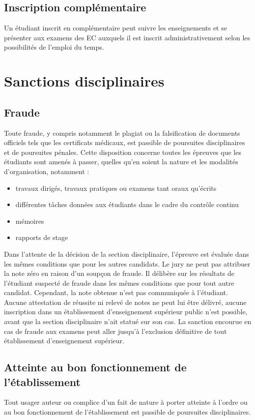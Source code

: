 \documentclass[a4paper,11pt]{article}
\begin{document}
\subsection{Inscription complémentaire}
Un étudiant inscrit en complémentaire peut suivre les enseignements et se présenter aux examens des EC auxquels il est inscrit administrativement selon les possibilités de l'emploi du temps.


\section{Sanctions disciplinaires}

\subsection{Fraude}
Toute fraude, y compris notamment le plagiat ou la falsification de documents officiels tels que les certificats médicaux, est passible de poursuites disciplinaires et de poursuites pénales. Cette disposition concerne toutes les épreuves que les étudiants sont amenés à passer, quelles qu'en soient la nature et les modalités d'organisation, notamment :
\begin{itemize}
	\item travaux dirigés, travaux pratiques ou examens tant oraux qu'écrits
	\item différentes tâches données aux étudiants dans le cadre du contrôle continu
	\item mémoires
	\item rapports de stage
\end{itemize}

Dans l'attente de la décision de la section disciplinaire, l'épreuve est évaluée dans les mêmes conditions que pour les autres candidats. Le jury ne peut pas attribuer la note zéro en raison d'un soupçon de fraude. Il délibère sur les résultats de l'étudiant suspecté de fraude dans les mêmes conditions que pour tout autre candidat. Cependant, la note obtenue n'est pas communiquée à l'étudiant. Aucune attestation de réussite ni relevé de notes ne peut lui être délivré, aucune inscription dans un établissement d'enseignement supérieur public n'est possible, avant que la section disciplinaire n'ait statué sur son cas.
La sanction encourue en cas de fraude aux examens peut aller jusqu'à l'exclusion définitive de tout établissement d'enseignement supérieur.


\subsection{Atteinte au bon fonctionnement de l'établissement}
Tout usager auteur ou complice d'un fait de nature à porter atteinte à l'ordre ou au bon fonctionnement de l'établissement est passible de poursuites disciplinaires.
\end{document}

